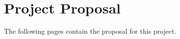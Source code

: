 \documentclass[12pt,twoside,notitlepage]{report}
\theoremstyle{definition}
\begin{document}
%
%
%
%
%
%
%


\chapter{Project Proposal}
The following pages contain the proposal for this project.

\end{document}
